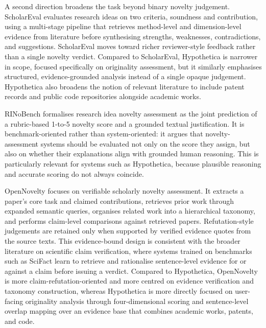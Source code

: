 A second direction broadens the task beyond binary novelty judgement. ScholarEval \citep{scholareval} evaluates research ideas on two criteria, soundness and contribution, using a multi-stage pipeline that retrieves method-level and dimension-level evidence from literature before synthesising strengths, weaknesses, contradictions, and suggestions. ScholarEval moves toward richer reviewer-style feedback rather than a single novelty verdict. Compared to ScholarEval, Hypothetica is narrower in scope, focused specifically on originality assessment, but it similarly emphasises structured, evidence-grounded analysis instead of a single opaque judgement. Hypothetica also broadens the notion of relevant literature to include patent records and public code repositories alongside academic works.

RINoBench \citep{rinobench} formalises research idea novelty assessment as the joint prediction of a rubric-based 1-to-5 novelty score and a grounded textual justification. It is benchmark-oriented rather than system-oriented: it argues that novelty-assessment systems should be evaluated not only on the score they assign, but also on whether their explanations align with grounded human reasoning. This is particularly relevant for systems such as Hypothetica, because plausible reasoning and accurate scoring do not always coincide.

OpenNovelty \citep{opennovelty} focuses on verifiable scholarly novelty assessment. It extracts a paper's core task and claimed contributions, retrieves prior work through expanded semantic queries, organises related work into a hierarchical taxonomy, and performs claim-level comparisons against retrieved papers. Refutation-style judgements are retained only when supported by verified evidence quotes from the source texts. This evidence-bound design is consistent with the broader literature on scientific claim verification, where systems trained on benchmarks such as SciFact \citep{wadden2020scifact} learn to retrieve and rationalise sentence-level evidence for or against a claim before issuing a verdict. Compared to Hypothetica, OpenNovelty is more claim-refutation-oriented and more centred on evidence verification and taxonomy construction, whereas Hypothetica is more directly focused on user-facing originality analysis through four-dimensional scoring and sentence-level overlap mapping over an evidence base that combines academic works, patents, and code.

